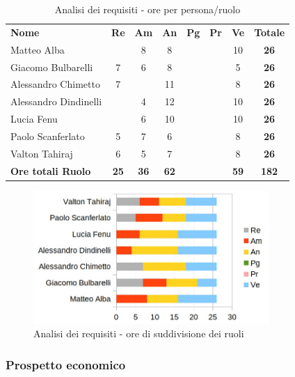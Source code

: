 		\begin{table} [h!]
			\begin{center}
				\begin{tabular} { m{3.5cm} c c c c c c c }
					\rowcolor{lightgray}
					\textbf{Nome} & \textbf{Re} & \textbf{Am} & \textbf{An} & \textbf{Pg} & \textbf{Pr} & \textbf{Ve} & \textbf{Totale} \\
					Matteo Alba & & 8 & 8 & & & 10 & \textbf{26} \\
					Giacomo Bulbarelli & 7 & 6 & 8 & & & 5 & \textbf{26} \\
					Alessandro Chimetto & 7 & & 11 & & & 8 & \textbf{26} \\
					Alessandro Dindinelli & & 4 & 12 & & & 10 & \textbf{26} \\
					Lucia Fenu & & 6 & 10 & & & 10 & \textbf{26} \\
					Paolo Scanferlato & 5 & 7 & 6 & & & 8 & \textbf{26} \\
					Valton Tahiraj & 6 & 5 & 7 & & & 8 & \textbf{26} \\
					\textbf{Ore totali Ruolo} & \textbf{25} & \textbf{36} & \textbf{62} & \textbf{} & \textbf{}& \textbf{59} & \textbf{182}
				\end{tabular}
				\caption{Analisi dei requisiti - ore per persona/ruolo}
			\end{center}
		\end{table}

		\begin{figure} [h!]
			\centering
			\includegraphics[width=0.8\textwidth]{res/img/grafici/analisi_dei_requisiti_ore_ruolo.jpg}
			\caption{Analisi dei requisiti - ore di suddivisione dei ruoli} 
		\end{figure}

	\newpage

	\subsubsection{Prospetto economico}

